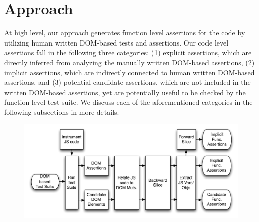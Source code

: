 \section{Approach} \label{Sec:approach}
At high level, our approach generates function level assertions for the \javascript code by utilizing human written DOM-based tests and assertions. Our code level assertions fall in the following three categories: (1) explicit assertions, which are directly inferred from analyzing the manually written DOM-based assertions, (2) implicit assertions, which are indirectly connected to human written DOM-based assertions, and (3) potential candidate assertions, which are not included in the written DOM-based assertions, yet are potentially useful to be checked by the function level test suite. We discuss each of the aforementioned categories in the following subsections in more details.

\begin{figure}
  \centering
  \includegraphics[width=.7\hsize]{fig/approachDiagram}
  \vspace{-0.1in} 
  \label{Fig:approachDiagram}
  \vspace{-0.1in} 
\end{figure}
